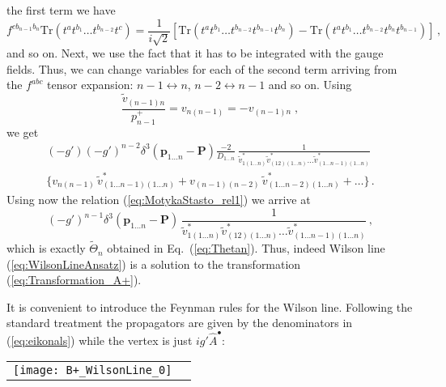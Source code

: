 \documentclass[english,american]{article}
\newcommand\myref{\refstepcounter{equation}\theequation}
\newcommand{\refmyref}[1]{\newcounter{#1}\setcounter{#1}{\theequation}}
\begin{document}
the first term we have
\begin{equation}
f^{cb_{n-1}b_{n}}\mathrm{Tr}\left(t^{a}t^{b_{1}}\dots t^{b_{n-2}}t^{c}\right)=\frac{1}{i\sqrt{2}}\left[\mathrm{Tr}\left(t^{a}t^{b_{1}}\dots t^{b_{n-2}}t^{b_{n-1}}t^{b_{n}}\right)-\mathrm{Tr}\left(t^{a}t^{b_{1}}\dots t^{b_{n-2}}t^{b_{n}}t^{b_{n-1}}\right)\right]\,,
\end{equation}
and so on. Next, we use the fact that it has to be integrated with
the gauge fields. Thus, we can change variables for each of the second
term arriving from the $f^{abc}$ tensor expansion: $n-1\leftrightarrow n$,
$n-2\leftrightarrow n-1$ and so on. Using
\begin{equation}
\frac{\tilde{v}_{\left(n-1\right)n}}{p_{n-1}^{+}}=v_{n\left(n-1\right)}=-v_{\left(n-1\right)n}\; ,
\end{equation}
we get
\begin{multline}
\left(-g'\right)\left(-g'\right)^{n-2}\delta^{3}\left(\mathbf{p}_{1\dots n}-\mathbf{P}\right)\frac{-2}{D_{1\dots n}}\,\frac{1}{\tilde{v}_{1\left(1\dots n\right)}^{*}\tilde{v}_{\left(12\right)\left(1\dots n\right)}^{*}\dots\tilde{v}_{\left(1\dots n-1\right)\left(1\dots n\right)}^{*}}\\
\Bigg\{ v_{n\left(n-1\right)}\,\tilde{v}_{\left(1\dots n-1\right)\left(1\dots n\right)}^{*}+v_{\left(n-1\right)\left(n-2\right)}\,\tilde{v}_{\left(1\dots n-2\right)\left(1\dots n\right)}^{*}+\dots\Bigg\}\,.
\end{multline}
Using now the relation (\ref{eq:MotykaStasto_rel1}) we arrive at
\begin{equation}
\left(-g'\right)^{n-1}\delta^{3}\left(\mathbf{p}_{1\dots n}-\mathbf{P}\right)\,\frac{1}{\tilde{v}_{1\left(1\dots n\right)}^{*}\tilde{v}_{\left(12\right)\left(1\dots n\right)}^{*}\dots\tilde{v}_{\left(1\dots n-1\right)\left(1\dots n\right)}^{*}}\,,
\end{equation}
which is exactly $\tilde{\Theta}_{n}$ obtained in Eq.~(\ref{eq:Thetan}).
Thus, indeed Wilson line (\ref{eq:WilsonLineAnsatz}) is a solution to the transformation
(\ref{eq:Transformation_A+}). 

It is convenient to introduce the Feynman rules for the Wilson line. Following
the standard treatment \citep{Collins:1981uw} the propagators are
given by the denominators in (\ref{eq:eikonals}) while the vertex
is just $ig'\hat{A}^{\bullet}$:

\begin{flushleft}
\begin{tabular}{>{\centering}m{}>{\centering}m{}}
\bigskip{}


\raggedright{}\centerline{\texttt{[image: B+\_WilsonLine\_0]}} & \centering{}\centering{(\myref )}
\refmyref{WL_diag_1}\tabularnewline
\end{tabular}
\par\end{flushleft}
\end{document}
